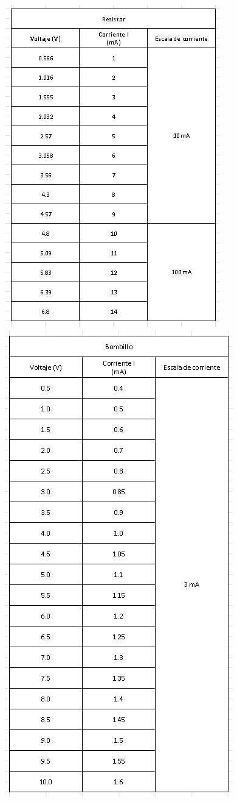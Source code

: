 \documentclass[10pt]{article}
\begin{document}
\begin{multicols}{2}

	\begin{figure}[H]
		\includegraphics[scale = .50]{./Images/Table1.png}
		\includegraphics[scale = .55]{./Images/Table2.png}

\end{figure}
\end{multicols}
\end{document}
